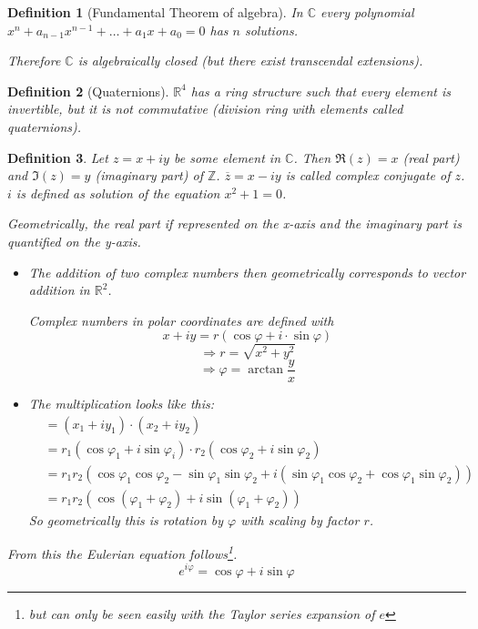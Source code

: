 \documentclass[a4paper,landscape,twocolumn]{article}
\newtheorem{defi}{Definition}
\begin{document}
\begin{defi}[Fundamental Theorem of algebra]
  In $\mathbb C$ every polynomial $x^n + a_{n-1} x^{n-1} + \dots + a_1 x + a_0 = 0$
  has $n$ solutions.

  Therefore $\mathbb C$ is algebraically closed (but there exist transcendal extensions).
\end{defi}

\begin{defi}[Quaternions]
  $\mathbb R^4$ has a ring structure such that every element is invertible,
  but it is not commutative (division ring with elements called \emph{quaternions}).
\end{defi}

\begin{defi}
  Let $z = x + iy$ be some element in $\mathbb C$.
  Then $\Re(z) = x$ (real part) and $\Im(z) = y$ (imaginary part) of $\mathbb Z$.
  $\overline{z} = x - iy$ is called complex conjugate of $z$. $i$ is defined
  as solution of the equation $x^2 + 1 = 0$.

  Geometrically, the real part if represented on the x-axis and the imaginary part
  is quantified on the y-axis.

  \begin{itemize}
    \item
      The addition of two complex numbers then geometrically corresponds to
      vector addition in $\mathbb R^2$.

      Complex numbers in polar coordinates are defined with
      \[ x + iy = r(\cos{\varphi} + i \cdot \sin{\varphi}) \]
      \[ \Rightarrow r = \sqrt{x^2 + y^2} \]
      \[ \Rightarrow \varphi = \arctan{\frac yx} \]
    \item The multiplication looks like this:
      \begin{align*}
        &= (x_1 + i y_1) \cdot (x_2 + i y_2) \\
        &= r_1 (\cos{\varphi_1} + i \sin{\varphi_i}) \cdot r_2 (\cos{\varphi_2} + i \sin{\varphi_2}) \\
        &= r_1 r_2 (\cos{\varphi_1} \cos{\varphi_2} - \sin{\varphi_1} \sin{\varphi_2} + i (\sin{\varphi_1} \cos{\varphi_2} + \cos{\varphi_1} \sin{\varphi_2})) \\
        &= r_1 r_2 (\cos{(\varphi_1 + \varphi_2)} + i \sin{(\varphi_1 + \varphi_2)})
      \end{align*}
      So geometrically this is rotation by $\varphi$ with scaling by factor $r$.
  \end{itemize}

  From this the Eulerian equation follows\footnote{but can only be seen easily with the Taylor series expansion of $e$}.
  \[ e^{i \varphi} = \cos{\varphi} + i \sin\varphi \]
\end{defi}
\end{document}
